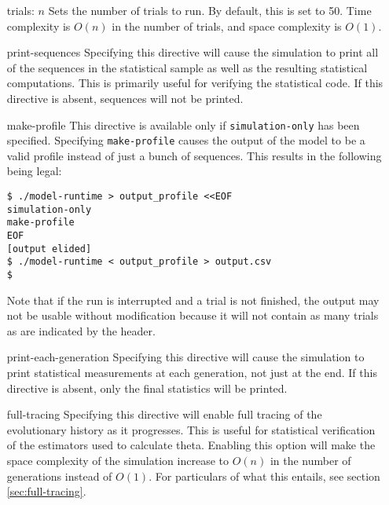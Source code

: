 \documentclass{article}
\begin{document}
        \begin{enumerate}
          \item[trials: $n$]
          Sets the number of trials to run. By default, this is set to 50. Time
          complexity is $O(n)$ in the number of trials, and space complexity is
          $O(1)$.

          \item[print-sequences]
          Specifying this directive will cause the simulation to print all of
          the sequences in the statistical sample as well as the resulting
          statistical computations. This is primarily useful for verifying the
          statistical code. If this directive is absent, sequences will not be
          printed.

	  \item[make-profile]
	  This directive is available only if \verb|simulation-only| has been
	  specified. Specifying \verb|make-profile| causes the output of the
	  model to be a valid profile instead of just a bunch of sequences. This
	  results in the following being legal:

	  \begin{verbatim}
$ ./model-runtime > output_profile <<EOF
simulation-only
make-profile
EOF
[output elided]
$ ./model-runtime < output_profile > output.csv
$
	  \end{verbatim}

	  Note that if the run is interrupted and a trial is not finished, the
	  output may not be usable without modification because it will not
	  contain as many trials as are indicated by the header.

          \item[print-each-generation]
          Specifying this directive will cause the simulation to print
          statistical measurements at each generation, not just at the end. If
          this directive is absent, only the final statistics will be printed.

          \item[full-tracing]
          Specifying this directive will enable full tracing of the evolutionary
          history as it progresses. This is useful for statistical verification
          of the estimators used to calculate theta. Enabling this option will
          make the space complexity of the simulation increase to $O(n)$ in the
          number of generations instead of $O(1)$. For particulars of what this
          entails, see section \ref{sec:full-tracing}.
        \end{enumerate}
\end{document}

